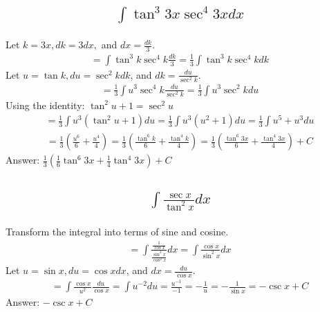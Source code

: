 \documentclass{article}
\begin{document}
\subsection{
	\begin{align*}
		\int{\tan^3{3x} \sec^4{3x} dx}
	\end{align*}
}
Let $k = 3x, dk = 3dx,$ and $dx = \frac{dk}{3}$. 
\begin{align*}
	= \int{\tan^3{k} \sec^4{k} \frac{dk}{3}} = \frac{1}{3} \int{\tan^3{k} \sec^4{k} dk}
\end{align*}
Let $u = \tan{k}, du = \sec^2{k} dk$, and $dk = \frac{du}{\sec^2{k}}$.
\begin{align*}
	= \frac{1}{3} \int{u^3 \sec^4{k} \frac{du}{\sec^2{k}}} = \frac{1}{3} \int{u^3 \sec^2{k} du}
\end{align*}
Using the identity: $\tan^2{u} + 1 = \sec^2{u}$
\begin{align*}
	= \frac{1}{3} \int{u^3 (\tan^2{u} + 1)du} = \frac{1}{3} \int{u^3 (u^2 + 1) du} = \frac{1}{3} \int{u^5 + u^3 du}
\end{align*}
\begin{align*}
	= \frac{1}{3} \left( \frac{u^6}{6} + \frac{u^4}{4} \right) = \frac{1}{3} \left( \frac{\tan^6{k}}{6} + \frac{\tan^4{k}}{4} \right) = \frac{1}{3} \left( \frac{\tan^6{3x}}{6} + \frac{\tan^4{3x}}{4} \right) + C
\end{align*}
Answer: $\frac{1}{3} \left( \frac{1}{6} \tan^6{3x} + \frac{1}{4}\tan^4{3x} \right) + C$

\subsection{
	\begin{align*}
		\int{\frac{\sec{x}}{\tan^2{x}} dx}
	\end{align*}
}
Transform the integral into terms of sine and cosine.
\begin{align*}
	= \int{\frac{\frac{1}{\cos{x}}}{\frac{\sin^2{x}}{\cos^2{x}}}dx} = \int{\frac{\cos{x}}{\sin^2{x}}dx}
\end{align*}
Let $u = \sin{x}, du = \cos{x} dx$, and $dx = \frac{du}{\cos{x}}$.
\begin{align*}
	= \int{\frac{\cos{x}}{u^2} \frac{du}{\cos{x}}} = \int{u^{-2} du} = \frac{u^{-1}}{-1} = -\frac{1}{u} = -\frac{1}{\sin{x}} = -\csc{x} + C
\end{align*}
Answer: $-\csc{x} + C$

\end{document}
